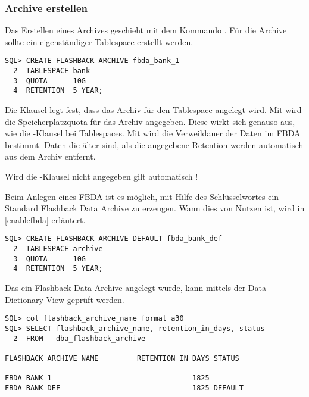         \subsubsection{Archive erstellen}
          Das Erstellen eines Archives geschieht mit dem Kommando . Für die Archive sollte ein eigenständiger Tablespace erstellt werden.
          \begin{lstlisting}[caption={Ein Flashback Data Archive anlegen},label=admin1725,language=oracle_sql]
SQL> CREATE FLASHBACK ARCHIVE fbda_bank_1
  2  TABLESPACE bank
  3  QUOTA      10G
  4  RETENTION  5 YEAR;
          \end{lstlisting}
          Die Klausel  legt fest, dass das Archiv  für den Tablespace  angelegt wird. Mit  wird die Speicherplatzquota für das Archiv angegeben. Diese wirkt sich genauso aus, wie die -Klausel bei Tablespaces. Mit  wird die Verweildauer der Daten im FBDA bestimmt. Daten die älter sind, als die angegebene Retention werden automatisch aus dem Archiv entfernt.
          \begin{merke}
            Wird die -Klausel nicht angegeben gilt automatisch !
          \end{merke}
          Beim Anlegen eines FBDA ist es möglich, mit Hilfe des Schlüsselwortes  ein Standard Flashback Data Archive zu erzeugen. Wann dies von Nutzen ist, wird in \ref{enablefbda} erläutert.
          \begin{lstlisting}[caption={Ein Default Flashback Data Archive anlegen},label=admin1726,language=oracle_sql]
SQL> CREATE FLASHBACK ARCHIVE DEFAULT fbda_bank_def
  2  TABLESPACE archive
  3  QUOTA      10G
  4  RETENTION  5 YEAR;
          \end{lstlisting}
          Das ein Flashback Data Archive angelegt wurde, kann mittels der Data Dictionary View  geprüft werden.
          \begin{lstlisting}[caption={\identifier{dba\_flashback\_archive} abfragen},label=admin1727,language=oracle_sql,alsolanguage=sqlplus]
SQL> col flashback_archive_name format a30 
SQL> SELECT flashback_archive_name, retention_in_days, status
  2  FROM   dba_flashback_archive

FLASHBACK_ARCHIVE_NAME         RETENTION_IN_DAYS STATUS
------------------------------ ----------------- -------
FBDA_BANK_1                                 1825
FBDA_BANK_DEF                               1825 DEFAULT
          \end{lstlisting}
